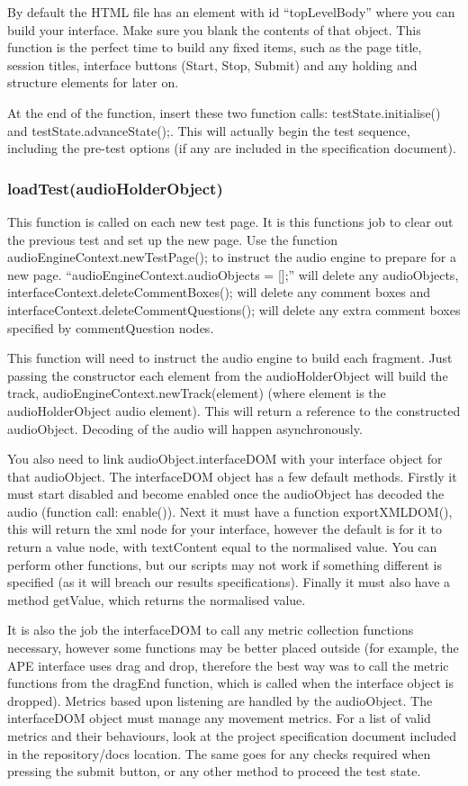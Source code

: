 \documentclass[11pt, oneside]{article}   	%
\begin{document}
			By default the HTML file has an element with id ``topLevelBody'' where you can build your interface. Make sure you blank the contents of that object. This function is the perfect time to build any fixed items, such as the page title, session titles, interface buttons (Start, Stop, Submit) and any holding and structure elements for later on.

			At the end of the function, insert these two function calls: testState.initialise() and testState.advanceState();. This will actually begin the test sequence, including the pre-test options (if any are included in the specification document).

		\subsubsection{loadTest(audioHolderObject)}
			This function is called on each new test page. It is this functions job to clear out the previous test and set up the new page. Use the function audioEngineContext.newTestPage(); to instruct the audio engine to prepare for a new page. ``audioEngineContext.audioObjects = [];'' will delete any audioObjects, interfaceContext.deleteCommentBoxes(); will delete any comment boxes and interfaceContext.deleteCommentQuestions(); will delete any extra comment boxes specified by commentQuestion nodes.

			This function will need to instruct the audio engine to build each fragment. Just passing the constructor each element from the audioHolderObject will build the track, audioEngineContext.newTrack(element) (where element is the audioHolderObject audio element). This will return a reference to the constructed audioObject. Decoding of the audio will happen asynchronously.

			You also need to link audioObject.interfaceDOM with your interface object for that audioObject. The interfaceDOM object has a few default methods. Firstly it must start disabled and become enabled once the audioObject has decoded the audio (function call: enable()). Next it must have a function exportXMLDOM(), this will return the xml node for your interface, however the default is for it to return a value node, with textContent equal to the normalised value. You can perform other functions, but our scripts may not work if something different is specified (as it will breach our results specifications). Finally it must also have a method getValue, which returns the normalised value.

			It is also the job the interfaceDOM to call any metric collection functions necessary, however some functions may be better placed outside (for example, the APE interface uses drag and drop, therefore the best way was to call the metric functions from the dragEnd function, which is called when the interface object is dropped). Metrics based upon listening are handled by the audioObject. The interfaceDOM object must manage any movement metrics. For a list of valid metrics and their behaviours, look at the project specification document included in the repository/docs location. The same goes for any checks required when pressing the submit button, or any other method to proceed the test state.
\end{document}

